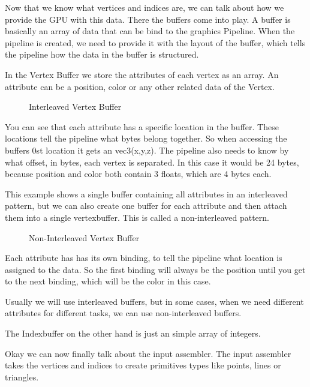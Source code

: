 \documentclass[12pt]{report} \usepackage{preamble}
\begin{document}
Now that we know what vertices and indices are, we can talk about how we
provide the GPU with this data. There the buffers come into play. A buffer
is basically an array of data that can be bind to the graphics Pipeline.
When the pipeline is created, we need to provide it with the layout of the
buffer, which tells the pipeline how the data in the buffer is structured.
\cite{vulkan-tutorial-vertex-buffer}

In the Vertex Buffer we store the attributes of each vertex as an
array. An attribute can be a position, color or any other related data
of the Vertex. \cite{vulkan-tutorial-vertex-buffer}

\begin{figure}[hbtp]
	\centering 
	\caption{Interleaved Vertex Buffer}
\end{figure} \FloatBarrier

You can see that each attribute has a specific location in the buffer.
These locations tell the pipeline what bytes belong together. So when
accessing the buffers 0st location it gets an vec3(x,y,z).  The pipeline
also needs to know by what offset, in bytes, each vertex is separated.
In this case it would be 24 bytes, because position and color both
contain 3 floats, which are 4 bytes each. \cite{vulkan-tutorial-vertex-buffer}

This example shows a single buffer containing all attributes in
an interleaved pattern, but we can also create one buffer for each
attribute and then attach them into a single vertexbuffer. This is called
a non-interleaved pattern.

\begin{figure}[hbtp]
	
	\caption{Non-Interleaved Vertex Buffer}
\end{figure} \FloatBarrier

Each attribute has has its own binding, to tell the pipeline what location
is assigned to the data. So the first binding will always be the position
until you get to the next binding, which will be the color in this case.
\cite{vulkan-tutorial-vertex-buffer}

Usually we will use interleaved buffers, but in some cases, when we need
different attributes for different tasks, we can use non-interleaved
buffers.

The Indexbuffer on the other hand is just an simple array of integers.
\cite{vulkan-tutorial-index-buffer}

Okay we can now finally talk about the input assembler. The input
assembler takes the vertices and indices to create primitives types like
points, lines or triangles. \cite{microsoft-ia}
\end{document}
